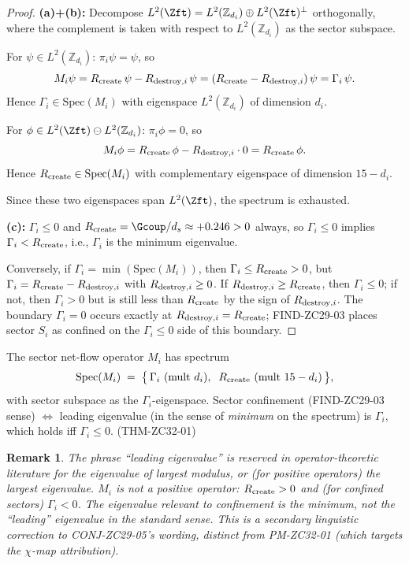 \documentclass[12pt, a4paper]{article}
\newtheorem{remark}{Remark}[section]
\begin{document}
\begin{proof}
\textbf{(a)+(b):} Decompose $L^2(\Zft) = L^2(\mathbb{Z}_{d_i})
\oplus L^2(\Zft)^\perp$ orthogonally, where the complement
is taken with respect to $L^2(\mathbb{Z}_{d_i})$ as the
sector subspace.

For $\psi \in L^2(\mathbb{Z}_{d_i})$: $\pi_i \psi = \psi$, so
\[
  M_i \psi
    = R_{\rm create}\,\psi - R_{{\rm destroy},i}\,\psi
    = (R_{\rm create} - R_{{\rm destroy},i})\,\psi
    = \Gamma_i\,\psi.
\]
Hence $\Gamma_i \in \mathrm{Spec}(M_i)$ with eigenspace
$L^2(\mathbb{Z}_{d_i})$ of dimension $d_i$.

For $\phi \in L^2(\Zft) \ominus L^2(\mathbb{Z}_{d_i})$:
$\pi_i \phi = 0$, so
\[
  M_i \phi
    = R_{\rm create}\,\phi - R_{{\rm destroy},i}\cdot 0
    = R_{\rm create}\,\phi.
\]
Hence $R_{\rm create} \in \mathrm{Spec}(M_i)$ with
complementary eigenspace of dimension $15 - d_i$.

Since these two eigenspaces span $L^2(\Zft)$, the spectrum
is exhausted.

\textbf{(c):} $\Gamma_i \leq 0$ and $R_{\rm create} =
\Gcoup/d_s \approx +0.246 > 0$ always, so $\Gamma_i \leq 0$
implies $\Gamma_i < R_{\rm create}$, i.e., $\Gamma_i$ is the
minimum eigenvalue.

Conversely, if $\Gamma_i = \min(\mathrm{Spec}(M_i))$, then
$\Gamma_i \leq R_{\rm create} > 0$, but
$\Gamma_i = R_{\rm create} - R_{{\rm destroy},i}$ with
$R_{{\rm destroy},i} \geq 0$. If $R_{{\rm destroy},i} \geq
R_{\rm create}$, then $\Gamma_i \leq 0$; if not, then
$\Gamma_i > 0$ but is still less than $R_{\rm create}$ by the
sign of $R_{{\rm destroy},i}$. The boundary $\Gamma_i = 0$
occurs exactly at $R_{{\rm destroy},i} = R_{\rm create}$;
FIND-ZC29-03 places sector $S_i$ as confined on the
$\Gamma_i \leq 0$ side of this boundary.
\end{proof}

\begin{derivedbox}[title={THM-ZC32-01: Spectral content (summary)}]
The sector net-flow operator $M_i$ has spectrum
\[
  \mathrm{Spec}(M_i) \;=\;
    \bigl\{\,\Gamma_i\ (\mathrm{mult}\ d_i),\;\;
            R_{\rm create}\ (\mathrm{mult}\ 15-d_i)\,\bigr\},
\]
with sector subspace as the $\Gamma_i$-eigenspace. Sector
confinement (FIND-ZC29-03 sense) $\Leftrightarrow$ leading
eigenvalue (in the sense of \emph{minimum} on the spectrum)
is $\Gamma_i$, which holds iff $\Gamma_i \leq 0$.
\hfill\textup{(THM-ZC32-01)}
\end{derivedbox}

\begin{remark}
The phrase ``leading eigenvalue'' is reserved in
operator-theoretic literature for the eigenvalue of largest
modulus, or (for positive operators) the largest eigenvalue.
$M_i$ is not a positive operator: $R_{\rm create} > 0$ and
(for confined sectors) $\Gamma_i < 0$. The eigenvalue
relevant to confinement is the \emph{minimum}, not the
``leading'' eigenvalue in the standard sense. This is a
secondary linguistic correction to CONJ-ZC29-05's wording,
distinct from PM-ZC32-01 (which targets the $\chi$-map
attribution).
\end{remark}
\end{document}
